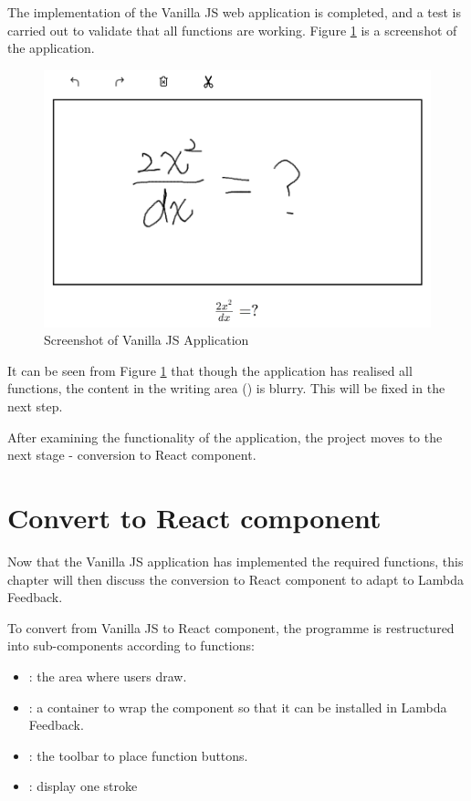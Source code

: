 \documentclass[12pt,twoside]{report}
\begin{document}
The implementation of the Vanilla JS web application is completed, and a test is carried out to validate that all functions are working. Figure \ref{fig:vanillajs-result} is a screenshot of the application.
\begin{figure}[h]
    \centering
    \includegraphics[width=\linewidth]{figures/vanillajs-result1.png}
    \caption{Screenshot of Vanilla JS Application}
    \label{fig:vanillajs-result}
\end{figure}

It can be seen from Figure \ref{fig:vanillajs-result} that though the application has realised all functions, the content in the writing area () is blurry. This will be fixed in the next step.

After examining the functionality of the application, the project moves to the next stage - conversion to React component. 

\section{Convert to React component}
\label{imp-react}
Now that the Vanilla JS application has implemented the required functions, this chapter will then discuss the conversion to React component to adapt to Lambda Feedback.

To convert from Vanilla JS to React component, the programme is restructured into sub-components according to functions:
\begin{itemize}
    \item {}: the area where users draw. 
    \item {}: a container to wrap the component so that it can be installed in Lambda Feedback.
    \item {}: the toolbar to place function buttons.
    \item {}: display one stroke
\end{itemize}
\end{document}
